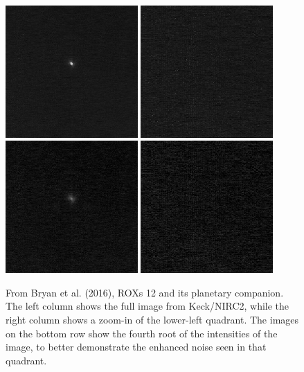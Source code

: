 \documentclass[12pt]{article}
\begin{document}
\begin{figure}[H]
\centering
\includegraphics[width=0.45\textwidth]{image.jpg}
\includegraphics[width=0.45\textwidth]{corner.jpg}
\includegraphics[width=0.45\textwidth]{image_root.png}
\includegraphics[width=0.45\textwidth]{corner_root.png}
\caption{From Bryan et al. (2016), ROXs 12 and its planetary companion. The left column shows the full image from Keck/NIRC2, while the right column shows a zoom-in of the lower-left quadrant. The images on the bottom row show the fourth root of the intensities of the image, to better demonstrate the enhanced noise seen in that quadrant.}
\end{figure}
\end{document}
